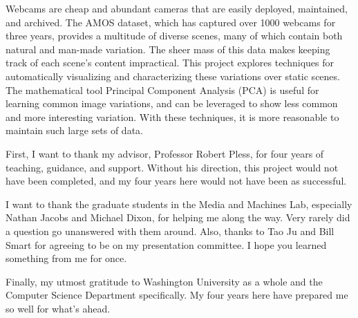 %

\begin{thesistitlepage}               %
\end{thesistitlepage}

\begin{thesisabstract}
Webcams are cheap and abundant cameras that are easily deployed, maintained, and archived.  The AMOS dataset, which has captured over 1000 webcams for three years, provides a multitude of diverse scenes, many of which contain both natural and man-made variation.  The sheer mass of this data makes keeping track of each scene's content impractical.  This project explores techniques for automatically visualizing and characterizing these variations over static scenes.  The mathematical tool Principal Component Analysis (PCA) is useful for learning common image variations, and can be leveraged to show less common and more interesting variation.  With these techniques, it is more reasonable to maintain such large sets of data.
\end{thesisabstract}

\begin{thesisacknowledgments}

First, I want to thank my advisor, Professor Robert Pless, for four years of teaching, guidance, and support.  Without his direction, this project would not have been completed, and my four years here would not have been as successful.

I want to thank the graduate students in the Media and Machines Lab, especially Nathan Jacobs and Michael Dixon, for helping me along the way.  Very rarely did a question go unanswered with them around.  Also, thanks to Tao Ju and Bill Smart for agreeing to be on my presentation committee.  I hope you learned something from me for once.

Finally, my utmost gratitude to Washington University as a whole and the Computer Science Department specifically.  My four years here have prepared me so well for what's ahead.

\end{thesisacknowledgments}


\begin{singlespace}
\tableofcontents



\listoffigures
\end{singlespace}

